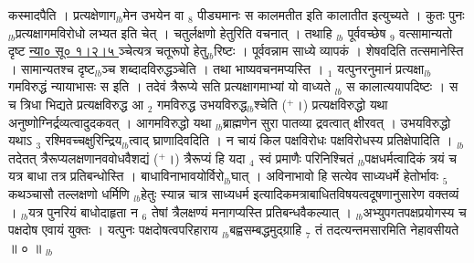 \documentclass[article,12pt,a4paper]{memoir}%
\newcommand{\add}[1]{($^{+}$#1)}
\newcounter{parCount}
\begin{document}
कस्मादपैति । प्रत्यक्षेणाग{\tiny $_{lb}$}मेन उभयेन वा {\tiny $_{8}$} पीड्यमानः स कालमतीत इति कालातीत इत्युच्यते । कुतः पुनः {\tiny $_{lb}$}प्रत्यक्षागमविरोधो लभ्यत इति चेत् । चतुर्लक्षणो हेतुरिति वचनात् । तथाहि {\tiny $_{lb}$} पूर्ववच्छेष {\tiny $_{9}$} \leavevmode{} वत्सामान्यतो दृष्ट \href{http://sarit.indology.info/?cref=ns\%C5\%AB.1.2.5}{न्या० सू० १।२।५ } ञ्चेत्यत्र चतूरूपो हेतु{\tiny $_{lb}$}रिष्टः । पूर्ववन्नाम साध्ये व्यापकं । शेषवदिति तत्समानेस्ति । सामान्यतश्च दृष्ट{\tiny $_{lb}$}ञ्च शब्दादविरुद्धञ्चेति । तथा भाष्यवचनमप्यस्ति । {\tiny $_{1}$} यत्पुनरनुमानं प्रत्यक्षा{\tiny $_{lb}$}गमविरुद्धं न्यायाभासः स इति । तदेवं त्रैरूप्ये सति प्रत्यक्षागमाभ्यां यो वाध्यते {\tiny $_{lb}$} \leavevmode{} स कालात्ययापदिष्टः । स च त्रिधा भिद्यते प्रत्यक्षविरुद्ध आ {\tiny $_{2}$} गमविरुद्ध उभयविरुद्ध{\tiny $_{lb}$}श्चेति \add{।} प्रत्यक्षविरुद्धो यथा अनुष्णोग्निर्द्रव्यत्वादुदकवत् । आगमविरुद्धो यथा {\tiny $_{lb}$}ब्राह्मणेन सुरा पातव्या द्रवत्वात् क्षीरवत् । उभयविरुद्धो यथाऽ {\tiny $_{3}$} रश्मिवच्चक्षुरिन्द्रिय{\tiny $_{lb}$}त्वाद् घ्राणादिवदिति । न चायं किल पक्षविरोधः पक्षविरोधस्य प्रतिक्षेपादिति । {\tiny $_{lb}$}तदेतत् त्रैरूप्यलक्षणानववोधवैशद्यं \add{।} त्रैरूप्यं हि यदा {\tiny $_{4}$} स्वं प्रमाणैः परिनिश्चितं {\tiny $_{lb}$}पक्षधर्मत्वादिकं त्रयं च यत्र बाधा तत्र प्रतिबन्धोस्ति । बाधाविनाभावयोर्विरो{\tiny $_{lb}$}घात् । अविनाभावो हि सत्येव साध्यधर्मे हेतोर्भावः {\tiny $_{5}$} कथञ्चासौ तल्लक्षणो धर्मिणि {\tiny $_{lb}$}हेतुः स्यान्न चात्र साध्यधर्म इत्यादिकमत्राबाधितविषयत्वदूषणानुसारेण वक्तव्यं । {\tiny $_{lb}$}यत्र पुनरियं बाधोदाहृता न {\tiny $_{6}$} तेषां त्रैलक्षण्यं मनागप्यस्ति प्रतिबन्धवैकल्यात् । {\tiny $_{lb}$}अभ्युपगतपक्षप्रयोगस्य च पक्षदोष एवायं युक्तः । यत्पुनः पक्षदोषत्वपरिहाराय {\tiny $_{lb}$}बह्वसम्बद्धमुद्ग्राहि {\tiny $_{7}$} तं तदत्यन्तमसारमिति नेहावसीयते ॥ ० ॥
	{}
	\pend%
      {\tiny $_{lb}$}
\end{document}
